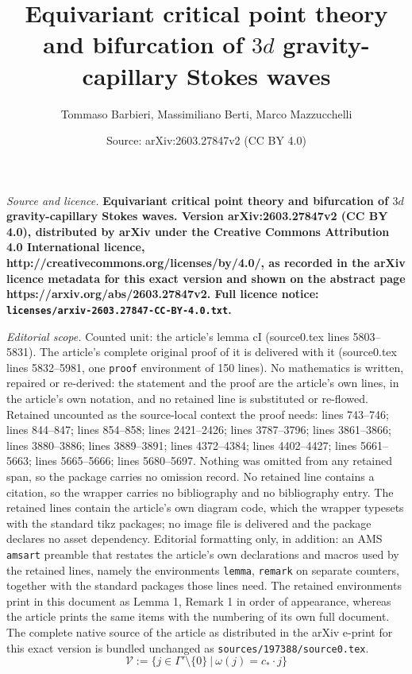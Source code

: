 \documentclass[10pt,a4paper]{amsart}
\title{\bf Equivariant critical point theory and bifurcation of $3d$ gravity-capillary Stokes waves}
\author{Tommaso Barbieri, Massimiliano Berti, Marco Mazzucchelli}
\date{Source: arXiv:2603.27847v2 (CC BY 4.0)}
\newcommand{\cV}{{\mathcal V}}
\begin{document}
\maketitle

\noindent\emph{Source and licence.} \bf Equivariant critical point theory and bifurcation of $3d$ gravity-capillary Stokes waves. Version arXiv:2603.27847v2 (CC BY 4.0), distributed by arXiv under the Creative Commons Attribution 4.0 International licence, http://creativecommons.org/licenses/by/4.0/, as recorded in the arXiv licence metadata for this exact version and shown on the abstract page https://arxiv.org/abs/2603.27847v2. Full licence notice: \texttt{licenses/arxiv-2603.27847-CC-BY-4.0.txt}.\par\smallskip

\noindent\textit{Editorial scope.} Counted unit: the article's lemma cI (source0.tex lines 5803--5831). The article's complete original proof of it is delivered with it (source0.tex lines 5832--5981, one \texttt{proof} environment of 150 lines). No mathematics is written, repaired or re-derived: the statement and the proof are the article's own lines, in the article's own notation, and no retained line is substituted or re-flowed.  Retained uncounted as the source-local context the proof needs: lines 743--746; lines 844--847; lines 854--858; lines 2421--2426; lines 3787--3796; lines 3861--3866; lines 3880--3886; lines 3889--3891; lines 4372--4384; lines 4402--4427; lines 5661--5663; lines 5665--5666; lines 5680--5697.  Nothing was omitted from any retained span, so the package carries no omission record.  No retained line contains a citation, so the wrapper carries no bibliography and no bibliography entry.  The retained lines contain the article's own diagram code, which the wrapper typesets with the standard tikz packages; no image file is delivered and the package declares no asset dependency.  Editorial formatting only, in addition: an AMS \texttt{amsart} preamble that restates the article's own declarations and macros used by the retained lines, namely the environments \texttt{lemma}, \texttt{remark} on separate counters, together with the standard packages those lines need.  The retained environments print in this document as Lemma 1, Remark 1 in order of appearance, whereas the article prints the same items with the numbering of its own full document.  The complete native source of the article as distributed in the arXiv e-print for this exact version is bundled unchanged as \texttt{sources/197388/source0.tex}.
 \begin{equation}\label{Def cV}
        \cV:= \big\{
        j\in \Gamma'\setminus\{0\} \ | \ \omega(j)=c_*\cdot j \big\} 
    \end{equation}
\end{document}

